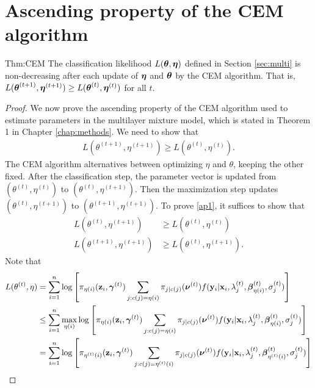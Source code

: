 \chapter{Ascending property of the CEM algorithm}
\label{append:2}

\begin{reptheorem}{Thm:CEM}
The classification likelihood $L(\boldsymbol\theta,\boldsymbol\eta)$ defined in Section \ref{sec:multi} is non-decreasing after each update of $\boldsymbol\eta$ and $\boldsymbol\theta$ by the CEM algorithm. That is, $L(\boldsymbol\theta^{(t+1)},\boldsymbol\eta^{(t+1)}) \geq L(\boldsymbol\theta^{(t)},\boldsymbol\eta^{(t)})$ for all $t$.
\end{reptheorem}

\begin{proof}
We now prove the ascending property of the CEM algorithm used to estimate parameters in the multilayer mixture model, which is stated in Theorem 1 in Chapter \ref{chap:methods}. We need to show that
    \begin{align}\label{ap1}L(\theta^{(t+1)},\eta^{(t+1)})\geq L(\theta^{(t)},\eta^{(t)}).\end{align}
    The CEM algorithm alternatives between optimizing $\eta$ and $\theta$, keeping the other fixed. After the classification step, the parameter vector is updated from $(\theta^{(t)},\eta^{(t)})$ to $(\theta^{(t)},\eta^{(t+1)})$. Then the maximization step updates $(\theta^{(t)},\eta^{(t+1)})$ to $(\theta^{(t+1)},\eta^{(t+1)})$. To prove \ref{ap1}, it suffices to show that
    \begin{align*}
    L(\theta^{(t)},\eta^{(t+1)})&\geq L(\theta^{(t)},\eta^{(t)})\\
    L(\theta^{(t+1)},\eta^{(t+1)})&\geq L(\theta^{(t)},\eta^{(t+1)}).
    \end{align*}
    Note that 
    \begin{align*}
 L(\theta^{(t)},\eta)&=\sum^{n}_{i=1}\log\left[\pi_{\eta(i)}(\B z_{i},\BS \gamma^{(t)})\sum_{j:c(j)=\eta(i)}\pi_{j|c(j)}(\BS\nu^{(t)})f(\B y_{i}|\B x_{i},\lambda_{j}^{(t)},\BS\beta^{(t)}_{\eta(i)},\sigma^{(t)}_{j})\right]\\
 &\leq \sum^{n}_{i=1}\max_{\eta(i)}\log\left[\pi_{\eta(i)}(\B z_{i},\BS \gamma^{(t)})\sum_{j:c(j)=\eta(i)}\pi_{j|c(j)}(\BS\nu^{(t)})f(\B y_{i}|\B x_{i},\lambda_{j}^{(t)},\BS\beta^{(t)}_{\eta(i)},\sigma^{(t)}_{j})\right]\\
  &= \sum^{n}_{i=1}\log\left[\pi_{\eta^{(t)}(i)}(\B z_{i},\BS \gamma^{(t)})\sum_{j:c(j)=\eta^{(t)}(i)}\pi_{j|c(j)}(\BS\nu^{(t)})f(\B y_{i}|\B x_{i},\lambda_{j}^{(t)},\BS\beta^{(t)}_{\eta^{(t)}(i)},\sigma^{(t)}_{j})\right]\\

\end{align*}
\end{proof}
